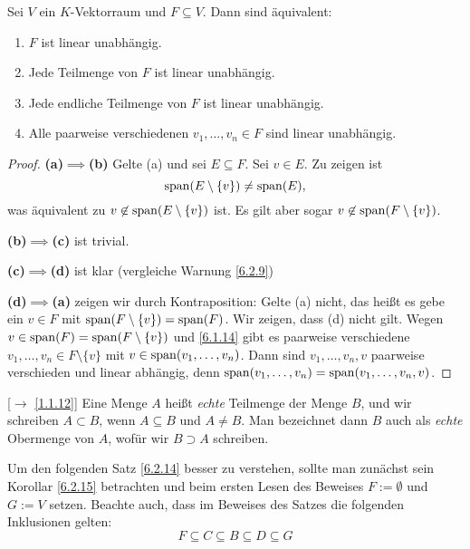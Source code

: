 \documentclass[../../main.tex]{subfiles}
\begin{document}
\begin{pro}\label{6.2.11}
Sei $V$ ein $K$-Vektorraum und $F\subseteq V$. Dann sind äquivalent:
\begin{enumerate}[\rm(a)]
\item $F$ ist linear unabhängig.
\item Jede Teilmenge von $F$ ist linear unabhängig.
\item Jede endliche Teilmenge von $F$ ist linear unabhängig.
\item Alle paarweise verschiedenen $v_1,\dots,v_n\in F$ sind linear unabhängig.
\end{enumerate}
\end{pro}
\begin{proof}{\bf (a)$\implies$(b)} Gelte (a) und sei $E\subseteq F$. Sei $v\in E$. Zu zeigen ist $$\operatorname{span}(E\setminus\{v\})\ne\operatorname{span}(E),$$ was äquivalent zu
$v\not\in\operatorname{span}(E\setminus\{v\})$ ist. Es gilt aber sogar $v\not\in\operatorname{span}(F\setminus\{v\})$.

\medskip\noindent
{\bf (b)$\implies$(c)} ist trivial.

\medskip\noindent
{\bf (c)$\implies$(d)} ist klar (vergleiche Warnung \ref{6.2.9})

\medskip\noindent
{\bf (d)$\implies$(a)} zeigen wir durch Kontraposition: Gelte (a) nicht, das heißt es gebe ein $v\in F$ mit $\operatorname{span}(F\setminus\{v\})=\operatorname{span}(F)$. Wir zeigen, dass (d) nicht gilt.
Wegen $v\in\operatorname{span}(F)=\operatorname{span}(F\setminus\{v\})$ und \ref{6.1.14} gibt es paarweise verschiedene $v_1,\dots,v_n\in F\setminus\{v\}$ mit $v\in\operatorname{span}(v_1,\dots,v_n)$. Dann sind
$v_1,\dots,v_n,v$ paarweise verschieden und linear abhängig, denn $\operatorname{span}(v_1,\dots,v_n)=\operatorname{span}(v_1,\dots,v_n,v)$. 
\end{proof}


\begin{nt}\mbox{}[$\to$ \ref{1.1.12}]\label{6.2.12}
Eine Menge $A$ heißt \emph{echte} Teilmenge der Menge $B$, und wir schreiben $A\subset B$, wenn $A\subseteq B$ und $A\ne B$. Man bezeichnet dann $B$ auch als
\emph{echte} Obermenge von $A$, wofür wir $B\supset A$ schreiben.
\end{nt}

\begin{bem}\label{6.2.13}
Um den folgenden Satz \ref{6.2.14} besser zu verstehen, sollte man zunächst sein Korollar \ref{6.2.15} betrachten und beim ersten Lesen des Beweises
$F:=\emptyset$ und $G:=V$ setzen. Beachte auch, dass im Beweises des Satzes die folgenden Inklusionen gelten:
$$F\subseteq C\subseteq B\subseteq D\subseteq G$$
\end{bem}
\end{document}
